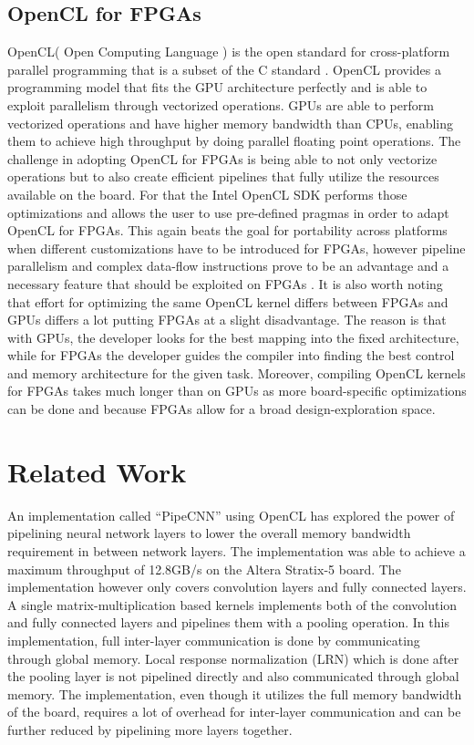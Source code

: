 \subsection{OpenCL for FPGAs}
OpenCL\texttrademark ( Open Computing Language ) is the open standard for cross-platform parallel programming that is a subset of the C standard \cite{opencl}. OpenCL provides a programming model that fits the GPU architecture perfectly and is able to exploit parallelism through vectorized operations. GPUs are able to perform vectorized operations and have higher memory bandwidth than CPUs, enabling them to achieve high throughput by doing parallel floating point operations. The challenge in adopting OpenCL for FPGAs is being able to not only vectorize operations but to also create efficient pipelines that fully utilize the resources available on the board. For that the Intel OpenCL SDK \cite{intel2016sdk, deepfpga} performs those optimizations and allows the user to use pre-defined pragmas in order to adapt OpenCL for FPGAs. This again beats the goal for portability across platforms when different customizations have to be introduced for FPGAs, however pipeline parallelism and complex data-flow instructions prove to be an advantage and a necessary feature that should be exploited on FPGAs \cite{ddl, deepfpga}.  It is also worth noting that effort for optimizing the same OpenCL kernel differs between FPGAs and GPUs differs a lot putting FPGAs at a slight disadvantage. The reason is that with GPUs, the developer looks for the best mapping into the fixed architecture, while for FPGAs the developer guides the compiler into finding the best control and memory architecture for the given task. Moreover, compiling OpenCL kernels for FPGAs takes much longer than on GPUs as more board-specific optimizations can be done and because FPGAs allow for a broad design-exploration space.


\section{Related Work}

An implementation called “PipeCNN” \cite{pipecnn} using OpenCL has explored the power of pipelining neural network layers to lower the overall memory bandwidth requirement in between network layers. The implementation was able to achieve a maximum throughput of 12.8GB/s on the Altera Stratix-5 board. The implementation however only covers convolution layers and fully connected layers. A single matrix-multiplication based kernels implements both of the convolution and fully connected layers and pipelines them with a pooling operation. In this implementation, full inter-layer communication is done by communicating through global memory. Local response normalization (LRN) which is done after the pooling layer is not pipelined directly and also communicated through global memory. The implementation, even though it utilizes the full memory bandwidth of the board, requires a lot of overhead for inter-layer communication and can be further reduced by pipelining more layers together.

